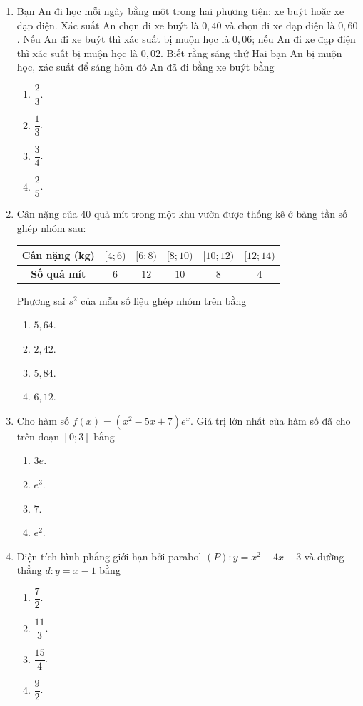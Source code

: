 \documentclass[12pt,a4paper]{article}
\begin{document}
\begin{enumerate}[label=\textbf{Câu \arabic*:}, leftmargin=*]
\item Bạn An đi học mỗi ngày bằng một trong hai phương tiện: xe buýt hoặc xe đạp điện. Xác suất An chọn đi xe buýt là $0{,}40$ và chọn đi xe đạp điện là $0{,}60$. Nếu An đi xe buýt thì xác suất bị muộn học là $0{,}06$; nếu An đi xe đạp điện thì xác suất bị muộn học là $0{,}02$. Biết rằng sáng thứ Hai bạn An bị muộn học, xác suất để sáng hôm đó An đã đi bằng xe buýt bằng
\begin{enumerate}[label=\Alph*.]
    \item $\dfrac{2}{3}$.
    \item $\dfrac{1}{3}$.
    \item $\dfrac{3}{4}$.
    \item $\dfrac{2}{5}$.
\end{enumerate}

\item Cân nặng của $40$ quả mít trong một khu vườn được thống kê ở bảng tần số ghép nhóm sau:
\begin{center}
\begin{tabular}{|c|c|c|c|c|c|}
\hline
\textbf{Cân nặng (kg)} & $[4; 6)$ & $[6; 8)$ & $[8; 10)$ & $[10; 12)$ & $[12; 14)$ \\ \hline
\textbf{Số quả mít} & $6$ & $12$ & $10$ & $8$ & $4$ \\ \hline
\end{tabular}
\end{center}
Phương sai $s^2$ của mẫu số liệu ghép nhóm trên bằng
\begin{enumerate}[label=\Alph*.]
    \item $5{,}64$.
    \item $2{,}42$.
    \item $5{,}84$.
    \item $6{,}12$.
\end{enumerate}

\item Cho hàm số $f(x) = (x^2 - 5x + 7)e^x$. Giá trị lớn nhất của hàm số đã cho trên đoạn $[0; 3]$ bằng
\begin{enumerate}[label=\Alph*.]
    \item $3e$.
    \item $e^3$.
    \item $7$.
    \item $e^2$.
\end{enumerate}

\item Diện tích hình phẳng giới hạn bởi parabol $(P): y = x^2 - 4x + 3$ và đường thẳng $d: y = x - 1$ bằng
\begin{enumerate}[label=\Alph*.]
    \item $\dfrac{7}{2}$.
    \item $\dfrac{11}{3}$.
    \item $\dfrac{15}{4}$.
    \item $\dfrac{9}{2}$.
\end{enumerate}


\end{enumerate}
\end{document}
